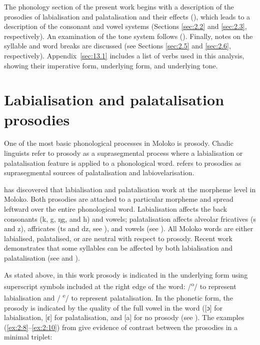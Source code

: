 The phonology section of the present work begins with a description of the prosodies of labialisation and palatalisation and their effects (), which leads to a description of the consonant and vowel systems (Sections \ref{sec:2.2} and \ref{sec:2.3}, respectively). An examination of the tone system follows (). Finally, notes on the syllable and word breaks are discussed (see Sections \ref{sec:2.5} and \ref{sec:2.6}, respectively). Appendix~\ref{sec:13.1} includes a list of verbs used in this analysis, showing their imperative form, underlying form, and underlying tone.

\section{Labialisation and palatalisation prosodies}\label{sec:2.1}
\hypertarget{RefHeading1210421525720847}{}
One of the most basic phonological processes in Moloko is prosody.  Chadic linguists refer to prosody as a suprasegmental process where a labialisation or palatalisation feature is applied to a phonological word. \citet{Wolff1981} refers to prosodies as suprasegmental sources of palatalisation and labiovelarisation.

\citet{Bow1997c} has discovered that labialisation and palatalisation work at the morpheme level in Moloko. Both prosodies are attached to a particular morpheme and spread leftward over the entire phonological word. Labialisation affects the back consonants (k, g, ŋg, and h) and vowels; palatalisation affects alveolar fricatives (s and z), affricates (ts and dz, see ), and vowels (see ).  All Moloko words are either labialised, palatalised, or are neutral with respect to prosody. Recent work demonstrates that some syllables can be affected by both labialisation and palatalisation (see  and ).  

As stated above, in this work prosody is indicated in the underlying form using superscript symbols included at the right edge of the word: /\textsuperscript{o}/ to represent labialisation and / \textsuperscript{e}/ to represent palatalisation.  In the phonetic form, the prosody is indicated by the quality of the full vowel in the word ([ɔ] for labialisation, [ɛ] for palatalisation, and [a] for no  prosody (see ). The examples (\ref{ex:2:8}--\ref{ex:2:10}) from \citet{Bow1997c} give evidence of contrast between the prosodies in a minimal triplet:


